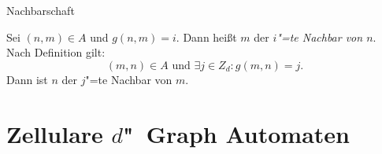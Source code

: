 \documentclass[18pt]{beamer}
\newcommand{\defWord}[1]{\emph{#1}}
\begin{document}
\begin{frame}{Nachbarschaft}
	\begin{definition}[Nachbarschaft]
		Sei $\left(n, m\right) \in A$ und $g\left(n, m\right) = i$. 
		Dann heißt $m$ der \defWord{$i$"=te Nachbar von $n$}.
		Nach Definition gilt: 
		\begin{displaymath}
		\left(m, n\right) \in A \text{ und }\exists j \in Z_d : g(m, n) = j.
		\end{displaymath}
		Dann ist $n$ der $j$"=te Nachbar von $m$. 
	\end{definition}
\end{frame}

\section{Zellulare $d$"~Graph Automaten}
\end{document}
